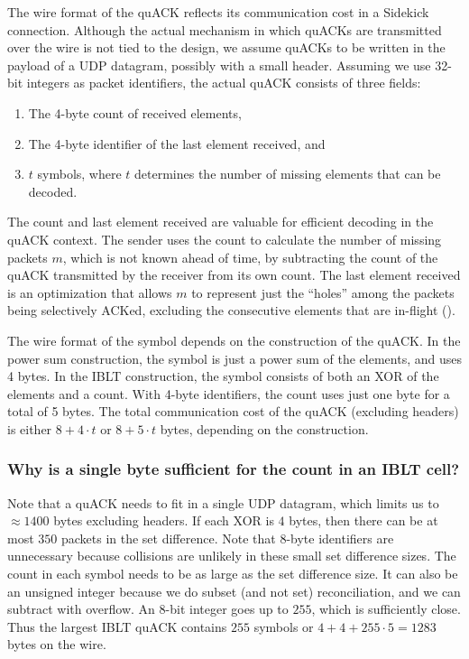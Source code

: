 The wire format of the quACK reflects its communication cost in a Sidekick
connection. Although the actual mechanism in which quACKs are transmitted over
the wire is not tied to the design, we assume quACKs to be written in the
payload of a UDP datagram, possibly with a small header. Assuming we use 32-bit
integers as packet identifiers, the actual quACK consists of three fields:

\begin{enumerate}[label=(\roman*),noitemsep]
\item The 4-byte count of received elements,
\item The 4-byte identifier of the last element received, and
\item $t$ symbols, where $t$ determines the number of missing elements that can
 be decoded.
\end{enumerate}

The count and last element received are valuable for efficient decoding in the
quACK context. The sender uses the count to calculate the number of missing
packets $m$, which is not known ahead of time, by subtracting the count of the
quACK transmitted by the receiver from its own count. The last element received
is an optimization that allows $m$ to represent just the ``holes'' among the
packets being selectively ACKed, excluding the consecutive elements that are
in-flight ().

The wire format of the symbol depends on the construction of the quACK. In the
power sum construction, the symbol is just a power sum of the elements, and
uses 4 bytes. In the IBLT construction, the symbol consists of both an XOR of
the elements and a count. With 4-byte identifiers, the count uses just one byte
for a total of 5 bytes. The total communication cost of the quACK (excluding
headers) is either $8+4\cdot t$ or $8+5\cdot t$ bytes, depending on the
construction.

\subsubsection{Why is a single byte sufficient for the count in an IBLT cell?}

Note that a quACK needs to fit in a single UDP datagram, which limits us to
$\approx\!1400$ bytes excluding headers. If each XOR is $4$ bytes, then there
can be at most $350$ packets in the set difference. Note that $8$-byte
identifiers are unnecessary because collisions are unlikely in these small set
difference sizes. The count in each symbol needs to be as large as the set
difference size. It can also be an unsigned integer because we do subset
(and not set) reconciliation, and we can subtract with overflow. An 8-bit
integer goes up to $255$, which is sufficiently close. Thus the largest IBLT
quACK contains $255$ symbols or $4 + 4 + 255 \cdot 5 = 1283$ bytes on the wire.

